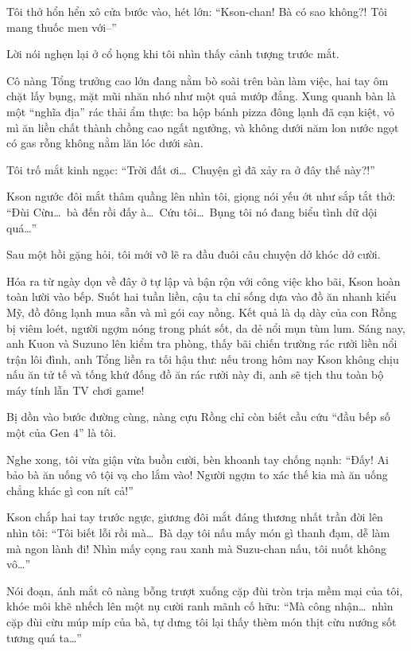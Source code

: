 \documentclass[../main.tex]{subfiles}
\begin{document}
Tôi thở hổn hển xô cửa bước vào, hét lớn: ``Kson-chan! Bà có sao không?! Tôi mang thuốc men với--''

Lời nói nghẹn lại ở cổ họng khi tôi nhìn thấy cảnh tượng trước mắt.

Cô nàng Tổng trưởng cao lớn đang nằm bò soài trên bàn làm việc, hai tay ôm chặt lấy bụng, mặt mũi nhăn nhó như một quả mướp đắng. Xung quanh bàn là một ``nghĩa địa'' rác thải ẩm thực: ba hộp bánh pizza đông lạnh đã cạn kiệt, vỏ mì ăn liền chất thành chồng cao ngất ngưởng, và không dưới năm lon nước ngọt có gas rỗng không nằm lăn lóc dưới sàn.

Tôi trố mắt kinh ngạc: ``Trời đất ơi\dots\ Chuyện gì đã xảy ra ở đây thế này?!''

Kson ngước đôi mắt thâm quầng lên nhìn tôi, giọng nói yếu ớt như sắp tắt thở: ``Đùi Cừu\dots\ bà đến rồi đấy à\dots\ Cứu tôi\dots\ Bụng tôi nó đang biểu tình dữ dội quá\dots''

Sau một hồi gặng hỏi, tôi mới vỡ lẽ ra đầu đuôi câu chuyện dở khóc dở cười.

Hóa ra từ ngày dọn về đây ở tự lập và bận rộn với công việc kho bãi, Kson hoàn toàn lười vào bếp. Suốt hai tuần liền, cậu ta chỉ sống dựa vào đồ ăn nhanh kiểu Mỹ, đồ đông lạnh mua sẵn và mì gói cay nồng. Kết quả là dạ dày của con Rồng bị viêm loét, người ngợm nóng trong phát sốt, da dẻ nổi mụn tùm lum. Sáng nay, anh Kuon và Suzuno lên kiểm tra phòng, thấy bãi chiến trường rác rưởi liền nổi trận lôi đình, anh Tổng liền ra tối hậu thư: nếu trong hôm nay Kson không chịu nấu ăn tử tế và tống khứ đống đồ ăn rác rưởi này đi, anh sẽ tịch thu toàn bộ máy tính lẫn TV chơi game!

Bị dồn vào bước đường cùng, nàng cựu Rồng chỉ còn biết cầu cứu ``đầu bếp số một của Gen 4'' là tôi.

Nghe xong, tôi vừa giận vừa buồn cười, bèn khoanh tay chống nạnh: ``Đấy! Ai bảo bà ăn uống vô tội vạ cho lắm vào! Người ngợm to xác thế kia mà ăn uống chẳng khác gì con nít cả!''

Kson chắp hai tay trước ngực, giương đôi mắt đáng thương nhất trần đời lên nhìn tôi: ``Tôi biết lỗi rồi mà\dots\ Bà dạy tôi nấu mấy món gì thanh đạm, dễ làm mà ngon lành đi! Nhìn mấy cọng rau xanh mà Suzu-chan nấu, tôi nuốt không vô\dots''

Nói đoạn, ánh mắt cô nàng bỗng trượt xuống cặp đùi tròn trịa mềm mại của tôi, khóe môi khẽ nhếch lên một nụ cười ranh mãnh cố hữu: ``Mà công nhận\dots\ nhìn cặp đùi cừu múp míp của bà, tự dưng tôi lại thấy thèm món thịt cừu nướng sốt tương quá ta\dots''
\end{document}
